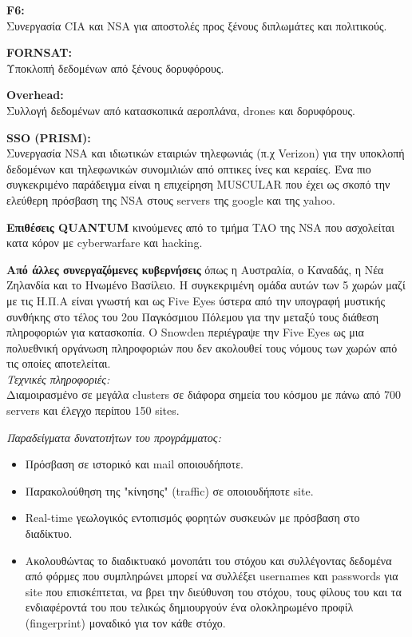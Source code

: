 \documentclass[a4paper, 11pt]{article}
\newcommand{\lt}{\latintext}
\begin{document}
\begin{itemize}
{\textbf {\lt F6:}} \\
Συνεργασία {\lt CIA} και {\lt NSA} για αποστολές προς ξένους διπλωμάτες και πολιτικούς.

{\textbf {\lt FORNSAT:}} \\
Υποκλοπή δεδομένων από ξένους δορυφόρους.

{\textbf {\lt Overhead:}} \\
Συλλογή δεδομένων από κατασκοπικά αεροπλάνα, {\lt drones} και δορυφόρους.

{\textbf {\lt  SSO (PRISM):}} \\
Συνεργασία {\lt NSA} και ιδιωτικών εταιριών τηλεφωνιάς (π.χ {\lt Verizon}) για την υποκλοπή δεδομένων και τηλεφωνικών συνομιλιών από οπτικες ίνες και κεραίες. Ένα πιο συγκεκριμένο παράδειγμα είναι η επιχείρηση {\lt MUSCULAR} που έχει ως σκοπό την ελεύθερη πρόσβαση της {\lt NSA} στους {\lt servers} της {\lt google} και της {\lt yahoo}.

{\textbf {Επιθέσεις {\lt QUANTUM}}} κινούμενες από το τμήμα {\lt TAO} της {\lt NSA} που ασχολείται κατα κόρον με {\lt cyberwarfare} και {\lt hacking}.

{\textbf {Από άλλες συνεργαζόμενες κυβερνήσεις}} όπως η Αυστραλία, ο Καναδάς, η Νέα Ζηλανδία και το Ηνωμένο Βασίλειο. Η συγκεκριμένη ομάδα αυτών των 5 χωρών μαζί με τις Η.Π.Α είναι γνωστή και ως {\lt Five Eyes} ύστερα από την υπογραφή μυστικής συνθήκης στο τέλος του 2ου Παγκόσμιου Πόλεμου για την μεταξύ τους διάθεση πληροφοριών για κατασκοπία. Ο {\lt Snowden} περιέγραψε την {\lt Five Eyes} ως μια πολυεθνική οργάνωση πληροφοριών που δεν ακολουθεί τους νόμους των χωρών από τις οποίες αποτελείται.
\\

{\textit {Τεχνικές πληροφοριές:}} \\
Διαμοιρασμένο σε μεγάλα {\lt clusters} σε διάφορα σημεία του κόσμου με πάνω από 700 {\lt servers} και έλεγχο περίπου 150 {\lt sites}.

{\textit {Παραδείγματα δυνατοτήτων του προγράμματος:}}
\begin{itemize}

\item Πρόσβαση σε ιστορικό και {\lt mail} οποιουδήποτε.
\item Παρακολούθηση της "κίνησης" ({\lt traffic}) σε οποιουδήποτε {\lt site}.
\item {\lt Real-time} γεωλογικός εντοπισμός φορητών συσκευών με πρόσβαση στο διαδίκτυο.
\item Ακολουθώντας το διαδικτυακό μονοπάτι του στόχου και συλλέγοντας δεδομένα από φόρμες που συμπληρώνει μπορεί να συλλέξει {\lt usernames} και {\lt passwords} για {\lt site} που επισκέπτεται, να βρει την διεύθυνση του στόχου, τους φίλους του και τα ενδιαφέροντά του που τελικώς δημιουργούν ένα ολοκληρωμένο προφίλ ({\lt fingerprint}) μοναδικό για τον κάθε στόχο.


\end{itemize}
\end{itemize}
\end{document}
